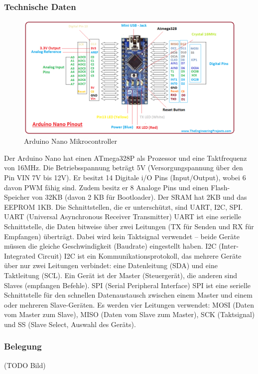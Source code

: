 \subsubsection{Technische Daten}
\begin{figure}[H]
    \centering
    \includegraphics[width=1\textwidth]{img/Hardware/arduino_nano.png}
    \caption{Arduino Nano Mikrocontroller}
    \label{fig:arduino_nano}
\end{figure}
Der Arduino Nano hat einen ATmega328P als Prozessor und eine Taktfrequenz von 16MHz.
%
Die Betriebsspannung beträgt 5V (Versorgungspannung über den Pin VIN 7V bis 12V). 
Er besitzt 14 Digitale i/O Pins (Input/Output),
wobei 6 davon PWM fähig sind.
%
Zudem besitz er 8 Analoge Pins und einen Flash-Speicher von 32KB (davon 2 KB für Bootloader). 
%
Der SRAM hat 2KB und das EEPROM 1KB. Die Schnittstellen, die er unterschützt, sind UART, I2C, SPI.
%
UART (Universal Asynchronous Receiver Transmitter)
UART ist eine serielle Schnittstelle, die Daten bitweise über zwei Leitungen (TX für Senden und RX für Empfangen) überträgt.
%
Dabei wird kein Taktsignal verwendet -- beide Geräte müssen die gleiche Geschwindigkeit (Baudrate) eingestellt haben.
%
I2C (Inter-Integrated Circuit)
I2C ist ein Kommunikationsprotokoll,
das mehrere Geräte über nur zwei Leitungen verbindet:
eine Datenleitung (SDA) und eine Taktleitung (SCL).
%
Ein Gerät ist der Master (Steuergerät), die anderen sind Slaves (empfangen Befehle).
%
SPI (Serial Peripheral Interface)
SPI ist eine serielle Schnittstelle für den schnellen Datenaustausch zwischen einem Master und einem oder mehreren Slave-Geräten.
%
Es werden vier Leitungen verwendet:
MOSI (Daten vom Master zum Slave),
MISO (Daten vom Slave zum Master),
SCK (Taktsignal)
und SS (Slave Select, Auswahl des Geräts).
\subsubsection{Belegung}
(TODO Bild)
